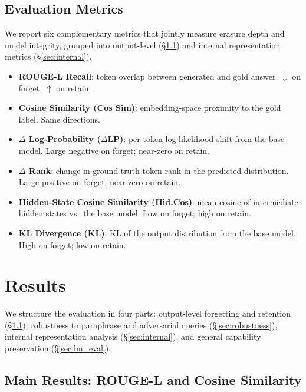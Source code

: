 \subsection{Evaluation Metrics}

We report six complementary metrics that jointly measure erasure depth and model integrity, grouped into output-level (§\ref{sec:main_results}) and internal representation metrics (§\ref{sec:internal}).

\begin{itemize}
    \item \textbf{ROUGE-L Recall}: token overlap between generated and gold answer. $\downarrow$ on forget, $\uparrow$ on retain.
    \item \textbf{Cosine Similarity (Cos Sim)}: embedding-space proximity to the gold label. Same directions.
    \item \textbf{$\Delta$ Log-Probability ($\Delta$LP)}: per-token log-likelihood shift from the base model. Large negative on forget; near-zero on retain.
    \item \textbf{$\Delta$ Rank}: change in ground-truth token rank in the predicted distribution. Large positive on forget; near-zero on retain.
    \item \textbf{Hidden-State Cosine Similarity (Hid.Cos)}: mean cosine of intermediate hidden states vs.\ the base model. Low on forget; high on retain.
    \item \textbf{KL Divergence (KL)}: KL of the output distribution from the base model. High on forget; low on retain.
\end{itemize}

\section{Results}
\label{sec:results}

We structure the evaluation in four parts: output-level forgetting and retention (§\ref{sec:main_results}), robustness to paraphrase and adversarial queries (§\ref{sec:robustness}), internal representation analysis (§\ref{sec:internal}), and general capability preservation (§\ref{sec:lm_eval}).

\subsection{Main Results: ROUGE-L and Cosine Similarity}
\label{sec:main_results}


